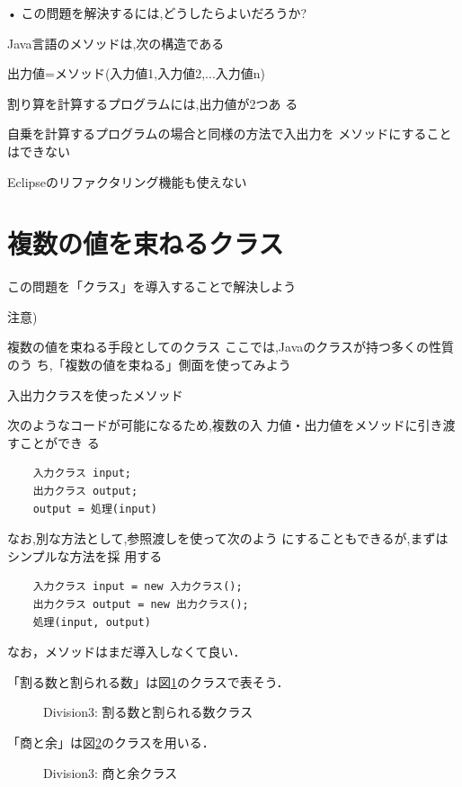 \documentclass[a4j, twoside]{jsbook}
\begin{document}
• この問題を解決するには,どうしたらよいだろうか?

Java言語のメソッドは,次の構造である

 出力値=メソッド(入力値1,入力値2,...入力値n)

割り算を計算するプログラムには,出力値が2つあ
る

 自乗を計算するプログラムの場合と同様の方法で入出力を
メソッドにすることはできない

 Eclipseのリファクタリング機能も使えない

\section{複数の値を束ねるクラス}

この問題を「クラス」を導入することで解決しよう

 注意)


複数の値を束ねる手段としてのクラス
ここでは,Javaのクラスが持つ多くの性質のう
ち,「複数の値を束ねる」側面を使ってみよう

入出力クラスを使ったメソッド

次のようなコードが可能になるため,複数の入
力値・出力値をメソッドに引き渡すことができ
る

\begin{verbatim}
	入力クラス input;
	出力クラス output;
	output = 処理(input)
\end{verbatim}

なお,別な方法として,参照渡しを使って次のよう
にすることもできるが,まずはシンプルな方法を採
用する

\begin{verbatim}
	入力クラス input = new 入力クラス();
	出力クラス output = new 出力クラス();
	処理(input, output)
\end{verbatim}


なお，メソッドはまだ導入しなくて良い．

「割る数と割られる数」は図\ref{fig:Division3:DividendAndDivisor}のクラスで表そう．
\begin{figure}
 
 \caption{Division3: 割る数と割られる数クラス}\label{fig:Division3:DividendAndDivisor}
\end{figure}


「商と余」は図\ref{fig:Division3:QuotientAndRemainder}のクラスを用いる．
\begin{figure}
 
 \caption{Division3: 商と余クラス}\label{fig:Division3:QuotientAndRemainder}
\end{figure}
\end{document}
